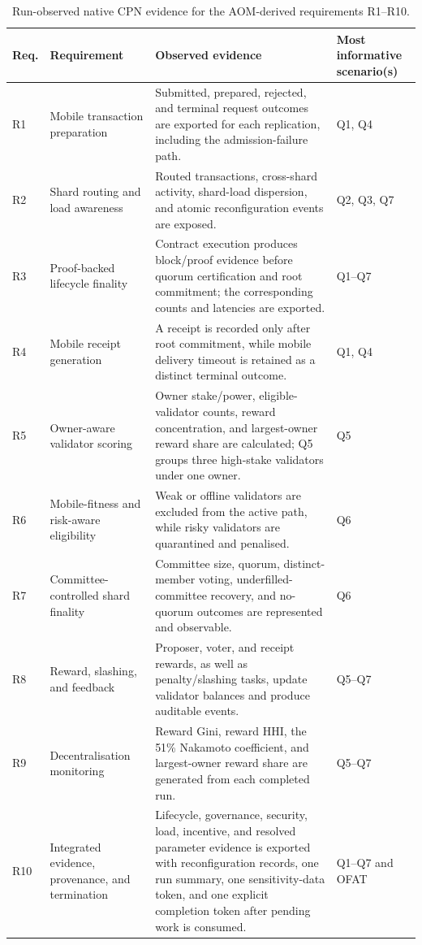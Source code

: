 \documentclass[a4paper,fleqn]{cas-sc}
\begin{document}
\begin{table}[pos=t]
\centering
\caption{Run-observed native CPN evidence for the AOM-derived requirements
R1--R10.}
\label{tab:reqsat}
\scriptsize
\setlength{\tabcolsep}{3.2pt}
\renewcommand{\arraystretch}{1.10}
\begin{tabularx}{\textwidth}{p{0.65cm}p{2.75cm}X p{2.35cm}}
\toprule
\textbf{Req.} & \textbf{Requirement} & \textbf{Observed evidence} &
\textbf{Most informative scenario(s)}\\
\midrule
R1 & Mobile transaction preparation & Submitted, prepared, rejected, and
terminal request outcomes are exported for each replication, including the
admission-failure path. & Q1, Q4\\
R2 & Shard routing and load awareness & Routed transactions, cross-shard
activity, shard-load dispersion, and atomic reconfiguration events are exposed. &
Q2, Q3, Q7\\
R3 & Proof-backed lifecycle finality & Contract execution produces block/proof
evidence before quorum certification and root commitment; the corresponding
counts and latencies are exported. & Q1--Q7\\
R4 & Mobile receipt generation & A receipt is recorded only after root
commitment, while mobile delivery timeout is retained as a distinct terminal
outcome. & Q1, Q4\\
R5 & Owner-aware validator scoring & Owner stake/power, eligible-validator
counts, reward concentration, and largest-owner reward share are calculated; Q5
groups three high-stake validators under one owner. & Q5\\
R6 & Mobile-fitness and risk-aware eligibility & Weak or offline validators are
excluded from the active path, while risky validators are quarantined and
penalised. & Q6\\
R7 & Committee-controlled shard finality & Committee size, quorum,
distinct-member voting, underfilled-committee recovery, and no-quorum outcomes
are represented and observable. & Q6\\
R8 & Reward, slashing, and feedback & Proposer, voter, and receipt rewards, as
well as penalty/slashing tasks, update validator balances and produce auditable
events. & Q5--Q7\\
R9 & Decentralisation monitoring & Reward Gini, reward HHI, the 51\% Nakamoto
coefficient, and largest-owner reward share are generated from each completed
run. & Q5--Q7\\
R10 & Integrated evidence, provenance, and termination & Lifecycle, governance, security, load, incentive, and resolved parameter evidence is exported with reconfiguration records, one run summary, one sensitivity-data token, and one explicit completion token after pending work is consumed. & Q1--Q7 and OFAT\\
\bottomrule
\end{tabularx}
\end{table}
\end{document}
